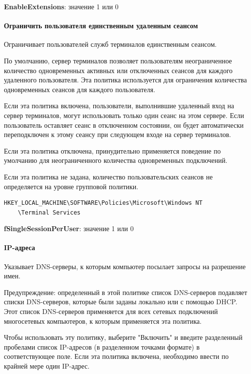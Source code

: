 \documentclass[russian,utf8,emptystyle]{eskdtext}
\begin{document}
\textbf{EnableExtensions}: значение 1 или 0

\paragraph{Ограничить пользователя единственным удаленным сеансом}

Ограничивает пользователей служб терминалов единственным сеансом. 

По умолчанию, сервер терминалов позволяет пользователям неограниченное количество одновременных активных или отключенных сеансов для каждого удаленного пользователя. Эта политика используется для ограничения количества одновременных сеансов для каждого пользователя.

Если эта политика включена, пользователи, выполнившие удаленный вход на сервер терминалов, могут использовать только один сеанс на этом сервере. Если пользователь оставляет сеанс в отключенном состоянии, он будет автоматически переподключен к этому сеансу при следующем входе на сервер терминалов.
 
Если эта политика отключена, принудительно применяется поведение по умолчанию для неограниченного количества одновременных подключений.

Если эта политика не задана, количество пользовательских сеансов не определяется на уровне групповой политики.

\begin{verbatim}
HKEY_LOCAL_MACHINE\SOFTWARE\Policies\Microsoft\Windows NT
	\Terminal Services
\end{verbatim}

\textbf{fSingleSessionPerUser}: значение 1 или 0

\paragraph{IP-адреса}

Указывает DNS-серверы, к которым компьютер посылает запросы на разрешение имен.

Предупреждение: определенный в этой политике список DNS-серверов подавляет списки DNS-серверов, которые были заданы локально или с помощью DHCP. Этот список DNS-серверов применяется для всех сетевых подключений многосетевых компьютеров, к которым применяется эта политика.

Чтобы использовать эту политику, выберите "Включить" и введите разделенный пробелами список IP-адресов (в разделенном точками формате) в соответствующее поле. Если эта политика включена, необходимо ввести по крайней мере один IP-адрес.
\end{document}
